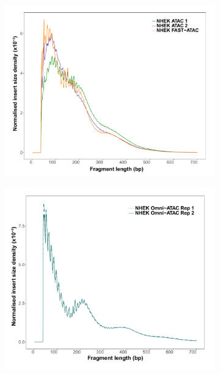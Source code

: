 \begin{figure}[htbp]
\centering
\begin{subfigure}{0.48\textwidth}
\centering
\includegraphics[width=\textwidth]{./Results1/pdfs/ATAC_NHEK_ATAC1_ATAC2_FAST_ATAC_fragment_size_distribution}
\caption{\textbf{}}
\end{subfigure}%
\begin{subfigure}{0.48\textwidth}
\centering
\includegraphics[width=\textwidth]{./Results1/pdfs/ATAC_NHEK_Omni_ATAC_fragment_size_distribution}
\caption{\textbf{}}

\end{subfigure}
\end{figure}
